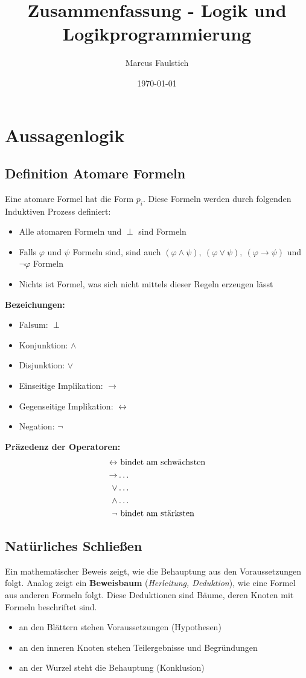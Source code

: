 \documentclass[12pt,a4paper]{report}
\title{Zusammenfassung - Logik und Logikprogrammierung}
\date{\today}
\author{Marcus Faulstich}
\newcommand{\ra}{\rightarrow}
\newcommand{\ls}{\newline\newline}
\newcommand{\logicand}{\wedge}
\newcommand{\logicor}{\vee}
\newcommand{\define}[1]{\section{\blue{Definition #1}}}
\newcommand{\red}[1]{\textcolor[rgb]{0.9,0.2,0.2}{#1}}
\newcommand{\blue}[1]{\textcolor[rgb]{0.2,0.2,1}{#1}}
\begin{document}
\maketitle
\hypertarget{contents}{}
\tableofcontents

\chapter{Aussagenlogik}

\define{Atomare Formeln}
Eine \red{atomare Formel} hat die Form $ p_i $. Diese Formeln werden durch folgenden Induktiven Prozess definiert:
\begin{itemize}
    \item Alle atomaren Formeln und $ \perp $ sind Formeln
    \item Falls $ \varphi $ und $ \psi  $ Formeln sind, sind auch $ (\varphi \logicand \psi),~ (\varphi \logicor \psi),~ (\varphi \ra \psi) $ und $ \lnot \varphi $ Formeln
    \item Nichts ist Formel, was sich nicht mittels dieser Regeln erzeugen lässt
\end{itemize}
\textbf{Bezeichungen: }
\begin{itemize}
    \item Falsum: $ \perp $
    \item Konjunktion: $ \logicand $
    \item Disjunktion: $ \logicor $
    \item Einseitige Implikation: $ \ra $
    \item Gegenseitige Implikation: $ \leftrightarrow $
    \item Negation: $ \lnot $
\end{itemize}
\textbf{Präzedenz der Operatoren:}
\begin{align*}
    \leftrightarrow &~ \textnormal{bindet am schwächsten}\\
    \ra & \dots\\\logicor & \dots\\\logicand & \dots\\
    \lnot &~ \textnormal{bindet am stärksten}
\end{align*}

\section{\blue{Natürliches Schließen}}
Ein mathematischer Beweis zeigt, wie die Behauptung aus den Voraussetzungen folgt. Analog zeigt ein \textbf{Beweisbaum} (\textit{Herleitung, Deduktion}), wie eine Formel aus anderen Formeln folgt.
\ls
Diese Deduktionen sind Bäume, deren Knoten mit Formeln beschriftet sind.
\begin{itemize}
    \item an den Blättern stehen Voraussetzungen (\red{Hypothesen})
    \item an den inneren Knoten stehen Teilergebnisse und Begründungen
    \item an der Wurzel steht die Behauptung (\red{Konklusion})
\end{itemize}
\end{document}
